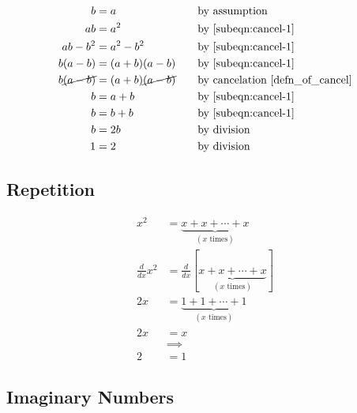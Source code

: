 \documentclass{article}
\newcommand{\justif}[2]{&{#1}&\text{#2}}
\begin{document}
	\begin{subequations}
	\begin{align}
		b        &= a  \justif{\quad}{by assumption} \label{subeqn:cancel-1} \\
		ab       &= a^2 \justif{\quad}{by \ref{subeqn:cancel-1}} \label{subeqn:cancel-2} \\
		ab - b^2 &= a^2 - b^2 \justif{\quad}{by \ref{subeqn:cancel-1}} \label{subeqn:cancel-3} \\
		b(a - b) &= (a + b)(a - b) \justif{\quad}{by \ref{subeqn:cancel-1}}  \label{subeqn:cancel-4} \\
		b\cancel{(a - b)} &= (a + b)\cancel{(a - b)} \justif{\quad}{by cancelation \cite{defn_of_cancel}} \label{subeqn:cancel-5} \\
		b        &= a + b \justif{\quad}{by \ref{subeqn:cancel-1}} \label{subeqn:cancel-6} \\
		b        &= b + b \justif{\quad}{by \ref{subeqn:cancel-1}} \label{subeqn:cancel-7} \\
		b        &= 2b \justif{\quad}{by division} \label{subeqn:cancel-8} \\
		1        &= 2 \justif{\quad}{by division} \label{subeqn:cancel-9}
	\end{align}
	\label{eqn:all-lines}
\end{subequations}

\subsection{Repetition}

\begin{equation}
	\begin{split}
		x^2& = \underbrace{x+x+\cdots+x}_{(x\text{ times})} \\
		\frac{d}{dx}x^2& = \frac{d}{dx}[\underbrace{x+x+\cdots+x}_{(x\text{ times})}] \\
		2x& = \underbrace{1+1+\cdots+1}_{(x\text{ times})} \\
		2x& = x \\
		& \implies \\
		2& = 1
	\end{split}
\end{equation}

\subsection{Imaginary Numbers}
\end{document}
